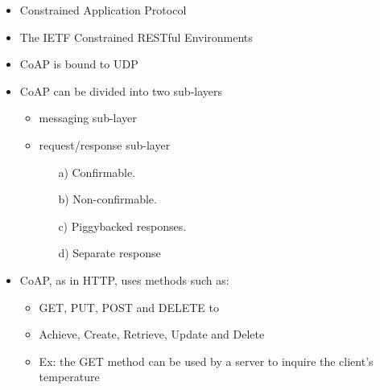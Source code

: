 \begin{itemize}
	\item Constrained Application Protocol
	\item The IETF Constrained RESTful Environments
	\item CoAP is bound to UDP
	\item CoAP can be divided into two sub-layers
		\begin{itemize}
			\item messaging sub-layer
			\item request/response sub-layer
			\begin{itemize}
				\item[a)] Confirmable. 
				\item[b)] Non-confirmable. 
				\item[c)] Piggybacked responses. 
				\item[d)] Separate response
			\end{itemize}
		\end{itemize}
	\item CoAP, as in HTTP, uses methods such as:
	\begin{itemize}
		\item GET, PUT, POST and DELETE to 
		\item Achieve, Create, Retrieve, Update and Delete
	\end{itemize}
	\begin{itemize}
		\item Ex: the GET method can be used by a server to inquire the client’s temperature
	\end{itemize}
\end{itemize}

